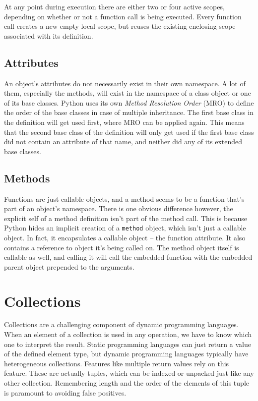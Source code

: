 \documentclass[a4paper, 16pt, oneside]{Thesis}
\begin{document}
At any point during execution there are either two or four active
scopes, depending on whether or not a function call is being executed.
Every function call creates a new empty local scope, but reuses the
existing enclosing scope associated with its definition.

\subsection{Attributes}\label{attributes}

An object's attributes do not necessarily exist in their own namespace.
A lot of them, especially the methods, will exist in the namespace of a
class object or one of its base classes. Python uses its own
\emph{Method Resolution Order} (MRO) to define the order of the base
classes in case of multiple inheritance. The first base class in the
definition will get used first, where MRO can be applied again. This
means that the second base class of the definition will only get used if
the first base class did not contain an attribute of that name, and
neither did any of its extended base classes.

\subsection{Methods}\label{methods}

Functions are just callable objects, and a method seems to be a function
that's part of an object's namespace. There is one obvious difference
however, the explicit self of a method definition isn't part of the
method call. This is because Python hides an implicit creation of a
\texttt{method} object, which isn't just a callable object. In fact, it
encapsulates a callable object -- the function attribute. It also
contains a reference to object it's being called on. The method object
itself is callable as well, and calling it will call the embedded
function with the embedded parent object prepended to the arguments.

\section{Collections}\label{collections}

Collections are a challenging component of dynamic programming
languages. When an element of a collection is used in any operation, we
have to know which one to interpret the result. Static programming
languages can just return a value of the defined element type, but
dynamic programming languages typically have heterogeneous collections.
Features like multiple return values rely on this feature. These are
actually tuples, which can be indexed or unpacked just like any other
collection. Remembering length and the order of the elements of this
tuple is paramount to avoiding false positives.
\end{document}

